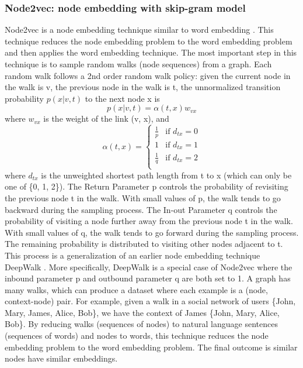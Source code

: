 \documentclass[12pt]{WSUThesis}
\theoremstyle{definition}
\begin{document}
\subsubsection{Node2vec: node embedding with skip-gram model}
Node2vec is a node embedding technique similar to word embedding \citep{grover2016node2vec}.
This technique reduces the node embedding problem to the word embedding problem and then applies the word embedding technique.
The most important step in this technique is to sample random walks (node sequences) from a graph.
Each random walk follows a 2nd order random walk policy: given the current node in the walk is v, the previous node in the walk is t, the unnormalized transition probability $ p(x | v, t) $ to the next node x is
\[ p(x | v, t) = \alpha(t, x) w_{vx} \]
where $ w_{vx} $ is the weight of the link (v, x), and
\begin{equation*}
	\alpha(t, x) =
	\begin{cases}
		\frac{1}{p} &\text{if $d_{tx} = 0$}\\
		1 &\text{if $d_{tx} = 1$}\\
		\frac{1}{q} &\text{if $d_{tx} = 2$}\\
	\end{cases}
\end{equation*}
where $ d_{tx} $ is the unweighted shortest path length from t to x (which can only be one of \{0, 1, 2\}).
The Return Parameter p controls the probability of revisiting the previous node t in the walk. With small values of p, the walk tends to go backward during the sampling process.
The In-out Parameter q controls the probability of visiting a node further away from the previous node t in the walk.
With small values of q, the walk tends to go forward during the sampling process.
The remaining probability is distributed to visiting other nodes adjacent to t.
This process is a generalization of an earlier node embedding technique DeepWalk \citep{perozzi2014deepwalk}.
More specifically, DeepWalk is a special case of Node2vec where the inbound parameter p and outbound parameter q are both set to 1.
A graph has many walks, which can produce a dataset where each example is a (node, context-node) pair.
For example, given a walk in a social network of users \{John, Mary, James, Alice, Bob\}, we have the context of James \{John, Mary, Alice, Bob\}.
By reducing walks (sequences of nodes) to natural language sentences (sequences of words) and nodes to words,
this technique reduces the node embedding problem to the word embedding problem.
The final outcome is similar nodes have similar embeddings.
\end{document}
